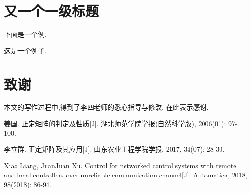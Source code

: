 \documentclass[UTF8,oneside,12pt]{article}  %
\newcommand{\xiaosihao}{\fontsize{12pt}{\baselineskip}\selectfont}
\newcommand{\wuhao}{\fontsize{10.5pt}{\baselineskip}\selectfont}
\theoremstyle{DingLi1}
\numberwithin{equation}{section}
\theoremstyle{DingLi2}
\newtheorem{example}{\hskip 2em 例}[section]
\begin{document}
\section{又一个一级标题 }

下面是一个例.
\begin{example}
  这是一个例子.
\end{example}




\section*{\heiti\xiaosihao 致谢}
本文的写作过程中,得到了李四老师的悉心指导与修改, 在此表示感谢.


\renewcommand\refname{\heiti \xiaosihao 参考文献}
\begin{thebibliography}{100}
\wuhao
{}
姜国. 正定矩阵的判定及性质[J]. 湖北师范学院学报(自然科学版), 2006(01): 97-100.

李立群. 正定矩阵及其应用[J]. 山东农业工程学院学报, 2017, 34(07): 28-30.

Xiao Liang, JuanJuan Xu. Control for networked control systems with remote and local controllers over unreliable communication channel[J]. Automatica, 2018, 98(2018): 86-94.


\end{thebibliography}
\end{document}
